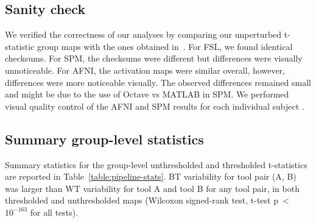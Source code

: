 \documentclass[conference]{IEEEtran}
\begin{document}
\subsection{Sanity check}

We verified the correctness of our analyses by comparing our unperturbed
t-statistic group maps with the ones obtained
in~\cite{bowring2019exploring}. For FSL, we found
identical checksums. For SPM, the checksums were different but differences
were visually unnoticeable. For AFNI, the activation maps were similar
overall, however, differences were more noticeable visually. 
The observed
differences remained small and might be due to the use of Octave vs MATLAB in
SPM. We performed visual quality control of the AFNI and SPM results
for each individual subject .

\subsection{Summary group-level statistics}

Summary statistics for the group-level unthresholded and thresholded
t-statistics are reported in Table~\ref{table:pipeline-stats}. BT
variability for tool pair (A, B) was larger than WT variability for tool A and tool B for any tool pair, in both thresholded and
unthresholded maps (Wilcoxon signed-rank test, t-test
p~\textless~$10^{-163}$ for all tests).


\end{document}
